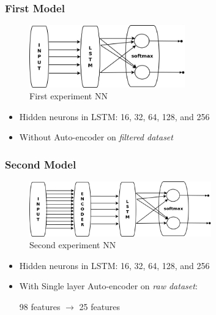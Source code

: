 \documentclass{beamer}
\begin{document}
\begin{frame}
\frametitle{First Model}
\begin{figure}[t!]
    \centering
    \includegraphics[width=0.6\textwidth]{../paper/pictures/figures/exp_NN1.png}
    \caption{First experiment NN}
    \label{fig:exp_NN1}
\end{figure}

\begin{itemize}
\item Hidden neurons in LSTM: 16, 32, 64, 128, and 256
\item Without Auto-encoder on {\em filtered dataset}
\end{itemize}
\end{frame}

\begin{frame}
\frametitle{Second Model}
\begin{figure}[t!]
    \centering
    \includegraphics[width=0.7\textwidth]{../paper/pictures/figures/exp_NN2.png}
    \caption{Second experiment NN}
    \label{fig:exp_NN2}
\end{figure}

\begin{itemize}
\item Hidden neurons in LSTM: 16, 32, 64, 128, and 256
\item With Single layer Auto-encoder on {\em raw dataset}:

98 features $\rightarrow$ 25 features
\end{itemize}
\end{frame}
\end{document}
